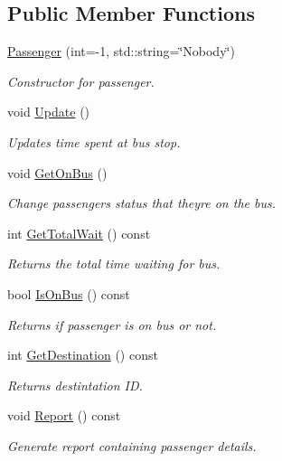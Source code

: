 \subsection*{Public Member Functions}
\begin{DoxyCompactItemize}
\item 
\hyperlink{classPassenger_a5c3addb9a6fd03e5e5642ed844e2702c}{Passenger} (int=-\/1, std\+::string=\char`\"{}Nobody\char`\"{})
\begin{DoxyCompactList}\small\item\em Constructor for passenger. \end{DoxyCompactList}\item 
\mbox{\label{classPassenger_a960de3b29fc17a2c2d79c0b79d5cf299}} 
void \hyperlink{classPassenger_a960de3b29fc17a2c2d79c0b79d5cf299}{Update} ()
\begin{DoxyCompactList}\small\item\em Updates time spent at bus stop. \end{DoxyCompactList}\item 
\mbox{\label{classPassenger_ae2ba639cfef39781ac079778578bd9fe}} 
void \hyperlink{classPassenger_ae2ba639cfef39781ac079778578bd9fe}{Get\+On\+Bus} ()
\begin{DoxyCompactList}\small\item\em Change passenger\textquotesingle{}s status that they\textquotesingle{}re on the bus. \end{DoxyCompactList}\item 
int \hyperlink{classPassenger_a25158560f790ef7ef06d94c414b34f25}{Get\+Total\+Wait} () const
\begin{DoxyCompactList}\small\item\em Returns the total time waiting for bus. \end{DoxyCompactList}\item 
bool \hyperlink{classPassenger_a2acf008ec444afcc859b914ee24add0e}{Is\+On\+Bus} () const
\begin{DoxyCompactList}\small\item\em Returns if passenger is on bus or not. \end{DoxyCompactList}\item 
int \hyperlink{classPassenger_a49db0ee527377aae6077df190a11501c}{Get\+Destination} () const
\begin{DoxyCompactList}\small\item\em Returns destintation ID. \end{DoxyCompactList}\item 
\mbox{\label{classPassenger_ac54ce797e412a4895febe10f07dc5df5}} 
void \hyperlink{classPassenger_ac54ce797e412a4895febe10f07dc5df5}{Report} () const
\begin{DoxyCompactList}\small\item\em Generate report containing passenger details. \end{DoxyCompactList}\end{DoxyCompactItemize}


